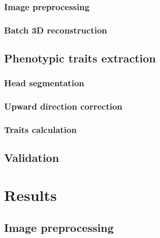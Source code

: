 

\subsubsection{Image preprocessing}



\subsubsection{Batch 3D reconstruction}



\subsection{Phenotypic traits extraction}



\subsubsection{Head segmentation}

\subsubsection{Upward direction correction}

\subsubsection{Traits calculation}


\subsection{Validation}




\section{Results}

\subsection{Image preprocessing}

